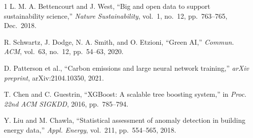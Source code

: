\documentclass[conference, 10pt, a4paper]{IEEEtran}
\begin{document}
\begin{thebibliography}{1}
L. M. A. Bettencourt and J. West, ``Big and open data to support
sustainability science,'' \emph{Nature Sustainability}, vol.~1, no.~12,
pp.~763--765, Dec.~2018.

R. Schwartz, J. Dodge, N. A. Smith, and O. Etzioni, ``Green AI,''
\emph{Commun. ACM}, vol.~63, no.~12, pp.~54--63, 2020.

D. Patterson et al., ``Carbon emissions and large neural network training,''
\emph{arXiv preprint}, arXiv:2104.10350, 2021.

T. Chen and C. Guestrin, ``XGBoost: A scalable tree boosting system,'' in
\emph{Proc. 22nd ACM SIGKDD}, 2016, pp.~785--794.

Y. Liu and M. Chawla, ``Statistical assessment of anomaly detection in
building energy data,'' \emph{Appl. Energy}, vol.~211, pp.~554--565, 2018.
\end{thebibliography}

\balance
\end{document}
